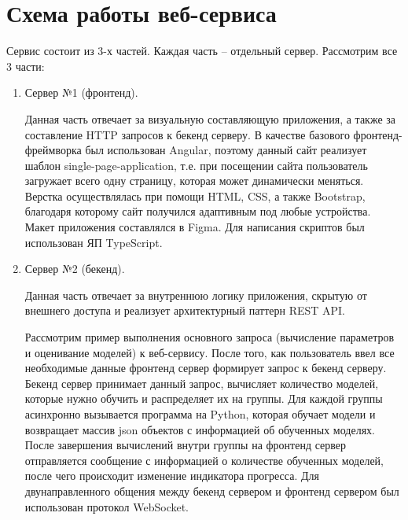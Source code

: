 \section*{Схема работы веб-сервиса}

Сервис состоит из 3-х частей. Каждая часть -- отдельный сервер. Рассмотрим все 3 части:

\begin{enumerate}[label=\arabic*.]
    \item Сервер №1 (фронтенд).
    
    Данная часть отвечает за визуальную составляющую приложения, а также за составление HTTP запросов к бекенд серверу. В качестве базового фронтенд-фреймворка был использован Angular, поэтому данный сайт реализует шаблон single-page-application, т.е. при посещении сайта пользователь загружает всего одну страницу, которая может динамически меняться. Верстка осуществлялась при помощи HTML, CSS, а также Bootstrap, благодаря которому сайт получился адаптивным под любые устройства. Макет приложения составлялся в Figma. Для написания скриптов был использован ЯП TypeScript.
    
    \item Сервер №2 (бекенд).
    
    Данная часть отвечает за внутреннюю логику приложения, скрытую от внешнего доступа и реализует архитектурный паттерн REST API.
    
    Рассмотрим пример выполнения основного запроса (вычисление параметров и оценивание моделей) к веб-сервису. После того, как пользователь ввел все необходимые данные фронтенд сервер формирует запрос к бекенд серверу. Бекенд сервер принимает данный запрос, вычисляет количество моделей, которые нужно обучить и распределяет их на группы. Для каждой группы асинхронно вызывается программа на Python, которая обучает модели и возвращает массив json объектов с информацией об обученных моделях. После завершения вычислений внутри группы на фронтенд сервер отправляется сообщение с информацией о количестве обученных моделей, после чего происходит изменение индикатора прогресса. Для двунаправленного общения между бекенд сервером и фронтенд сервером был использован протокол WebSocket.
    

\end{enumerate}
